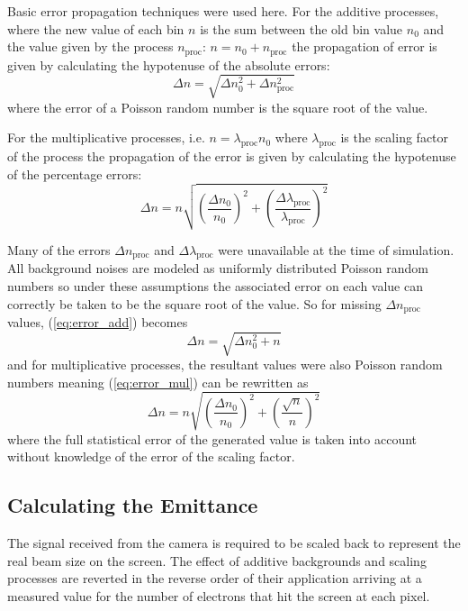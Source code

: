 Basic error propagation techniques were used here. For the additive processes,
where the new value of each bin $n$ is the sum between the old bin value $n_0$
and the value given by the process $n_\text{proc}$: $n=n_0+n_\text{proc}$ the
propagation of error is given by calculating the hypotenuse of the absolute
errors:
\begin{equation}
	\Delta n= \sqrt{\Delta n_0^2 + \Delta n_\text{proc}^2}
	\label{eq:error_add}
\end{equation}
where the error of a Poisson random number is the square root of the value.

For the multiplicative processes, i.e. $n = \lambda_\text{proc}n_0 $ where
$\lambda_\text{proc}$ is the scaling factor of the process the propagation of
the error is given by calculating the hypotenuse of the percentage errors:
\begin{equation}
	\Delta n= n \sqrt{
		\left( \frac{\Delta n_0}{n_0} \right)^2 +
		\left( \frac{\Delta \lambda_\text{proc}}{\lambda_\text{proc}} \right)^2}
	\label{eq:error_mul}
\end{equation}

Many of the errors \(\Delta n_\text{proc}\) and \(\Delta \lambda_\text{proc}\)
were unavailable at the time of simulation. All background noises are modeled as
uniformly distributed Poisson random numbers so under these assumptions the
associated error on each value can correctly be taken to be the square root of
the value. %
So for missing \(\Delta n_\text{proc}\) values, (\ref{eq:error_add}) becomes
\begin{equation}
	\Delta n= \sqrt{\Delta n_0^2 + n}
\end{equation}
and for multiplicative processes, the resultant values were also Poisson random
numbers meaning (\ref{eq:error_mul}) can be rewritten as
\begin{equation}
	\Delta n= n \sqrt{
		\left( \frac{\Delta n_0}{n_0} \right)^2 +
	\left( \frac{\sqrt{n}}{n} \right)^2}
\end{equation}
where the full statistical error of the generated value is taken into account
without knowledge of the error of the scaling factor.

\subsection{Calculating the Emittance}

The signal received from the camera is required to be scaled back to represent
the real beam size on the screen. The effect of additive backgrounds and scaling
processes are reverted in the reverse order of their application arriving at a
measured value for the number of electrons that hit the screen at each pixel.

